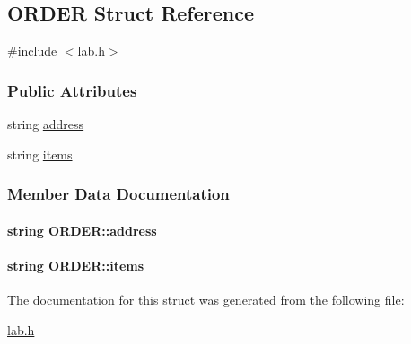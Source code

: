 \hypertarget{structORDER}{\subsection{O\+R\+D\+E\+R Struct Reference}
\label{structORDER}
}


{\ttfamily \#include $<$lab.\+h$>$}

\subsubsection*{Public Attributes}
\begin{DoxyCompactItemize}
\item 
string \hyperlink{structORDER_a6b9ce0a29de13c2c2f1721627dba4812}{address}
\item 
string \hyperlink{structORDER_a244508e0d34d5da2b9ff18a5e02cbcf9}{items}
\end{DoxyCompactItemize}


\subsubsection{Member Data Documentation}
\hypertarget{structORDER_a6b9ce0a29de13c2c2f1721627dba4812}{
\paragraph[{address}]{\setlength{\rightskip}{0pt plus 5cm}string O\+R\+D\+E\+R\+::address}}\label{structORDER_a6b9ce0a29de13c2c2f1721627dba4812}
\hypertarget{structORDER_a244508e0d34d5da2b9ff18a5e02cbcf9}{
\paragraph[{items}]{\setlength{\rightskip}{0pt plus 5cm}string O\+R\+D\+E\+R\+::items}}\label{structORDER_a244508e0d34d5da2b9ff18a5e02cbcf9}


The documentation for this struct was generated from the following file\+:\begin{DoxyCompactItemize}
\item 
\hyperlink{lab_8h}{lab.\+h}\end{DoxyCompactItemize}
